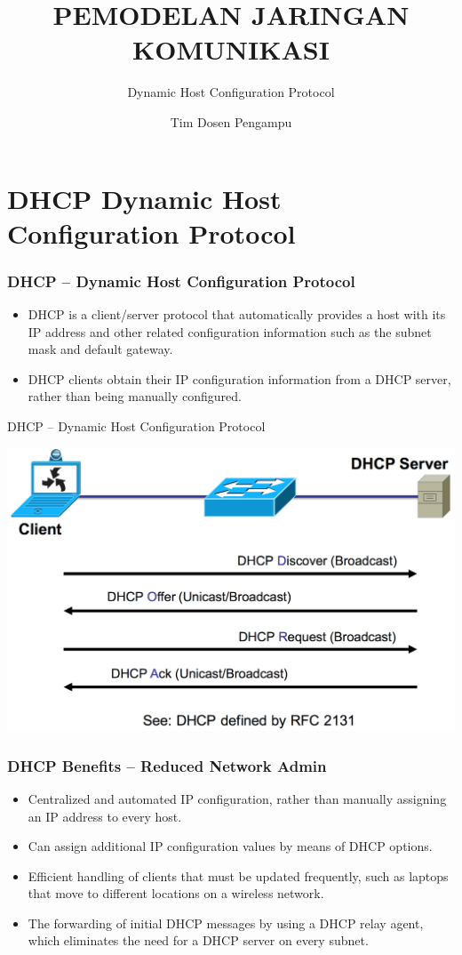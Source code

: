 \documentclass[pdflatex,compress,mathserif]{beamer}
\title{PEMODELAN JARINGAN KOMUNIKASI}
\subtitle{Dynamic Host Configuration Protocol}
\author{Tim Dosen Pengampu}
\begin{document}
	
\maketitle

\section{DHCP Dynamic Host Configuration Protocol}


\begin{frame}
	\frametitle{DHCP – Dynamic Host Configuration Protocol}
	\begin{itemize}
		\item DHCP is a client/server protocol that automatically provides a host
with its IP address and other related configuration information such as
the subnet mask and default gateway.
		\item DHCP clients obtain their IP configuration information from a DHCP
server, rather than being manually configured.
	\end{itemize}
\end{frame}

\begin{frame}{DHCP – Dynamic Host Configuration Protocol}
	\begin{center}
		\includegraphics[width=0.8\linewidth]{img/img01}
	\end{center}
\end{frame}

\begin{frame}
	\frametitle{DHCP Benefits – Reduced Network Admin}
	\begin{itemize}
		\item Centralized and automated IP configuration, rather than manually
assigning an IP address to every host.
		\item Can assign additional IP configuration values by means of DHCP
options.
		\item Efficient handling of clients that must be updated frequently, such as
laptops that move to different locations on a wireless network.
		\item The forwarding of initial DHCP messages by using a DHCP relay agent,
which eliminates the need for a DHCP server on every subnet.
	\end{itemize}
\end{frame}
\end{document}
